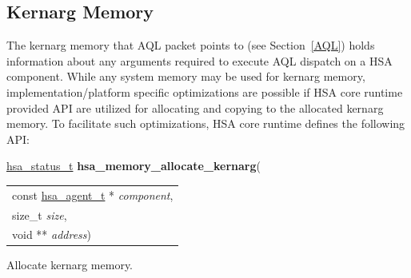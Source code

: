 \documentclass[final]{book}
\newcommand{\hsaarg}[1]{\textit{#1}}
\begin{document}
\hypertarget{kernarg}{}\subsection{Kernarg Memory}\label{kernargmem}

The kernarg memory that AQL packet points to (see Section~\ref{AQL}) holds
information about any arguments required to execute AQL dispatch on a HSA
component. While any system memory may be used for kernarg memory,
implementation/platform specific optimizations are possible if HSA core runtime
provided API are utilized for allocating and copying to the allocated kernarg
memory. To facilitate such optimizations, HSA core runtime defines the following
API:

\makeatletter{}

\noindent\begin{tcolorbox}[breakable,nobeforeafter,colframe=white,colback=lightgray,left=0mm]
\hyperlink{group--status-1gad755322e7ff95456520e8abdbe90d225}{hsa_status_t} \hypertarget{group--kernargmem-1ga9bcec6a182d021007b4c5c2b6b0467fc}{\textbf{hsa_memory_allocate_kernarg}}(
\vspace{-3.5mm}\begin{longtable}{@{}p{\textwidth}}
\hspace{1.7em}const \hyperlink{group--topology-1gab8db3fb886332a24acac08ec361e1d86}{hsa_agent_t} * \hsaarg{component},\\
\hspace{1.7em}size_t \hsaarg{size},\\
\hspace{1.7em}void ** \hsaarg{address})\end{longtable}

\end{tcolorbox}
Allocate kernarg memory.
\end{document}
